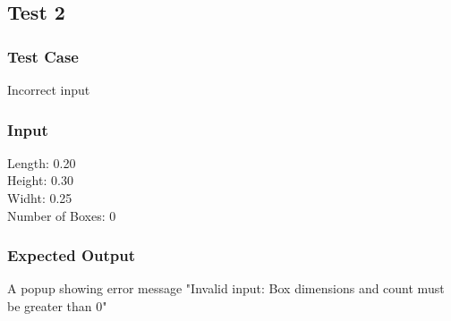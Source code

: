 \documentclass[12pt]{article}
\begin{document}
\subsection{Test 2}
\subsubsection{Test Case}
Incorrect input
\subsubsection{Input}
Length: 0.20\\
Height: 0.30\\
Widht: 0.25\\
Number of Boxes: 0\\
\subsubsection{Expected Output}
A popup showing error message "Invalid input: Box dimensions and count must be greater than 0"
\end{document}
